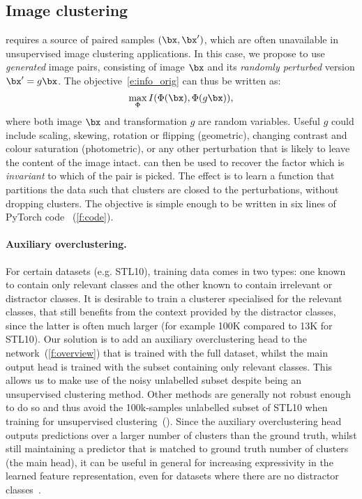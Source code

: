 \subsection{Image clustering}\label{s:image_clustering}

\methodnameshort requires a source of paired samples $(\bx,\bx')$, which are often unavailable in unsupervised image clustering applications. In this case, we propose to use \emph{generated} image pairs, consisting of image $\bx$ and its \emph{randomly perturbed} version $\bx' = g\bx$. The objective~\cref{e:info_orig} can thus be written as:
%
\begin{equation}\label{e:info_clustering}
\max_\Phi I(\Phi(\bx),\Phi(g\bx)),
\end{equation}
%
where both image $\bx$ and transformation $g$ are random variables.
Useful $g$ could include scaling, skewing, rotation or flipping (geometric), changing contrast and colour saturation (photometric), or any other perturbation that is likely to leave the content of the image intact.
\methodnameshort can then be used to recover the factor which is \emph{invariant} to which of the pair is picked. 
The effect is to learn a function that partitions the data such that clusters are closed to the perturbations, without dropping clusters. 
The objective is simple enough to be written in six lines of PyTorch code ~(\cref{f:code}).

 

%

\paragraph{Auxiliary overclustering.}\label{s:overcluster}

For certain datasets (e.g. STL10), training data comes in two types: one known to contain only relevant classes and the other known to contain irrelevant or distractor classes. It is desirable to train a clusterer specialised for the relevant classes, that still benefits from the context provided by the distractor classes, since the latter is often much larger (for example 100K compared to 13K for STL10).
Our solution is to add an auxiliary overclustering head to the network~(\cref{f:overview}) that is trained with the full dataset, whilst the main output head is trained with the subset containing only relevant classes.
This allows us to make use of the noisy unlabelled subset despite being an unsupervised clustering method. 
Other methods are generally not robust enough to do so and thus avoid the 100k-samples unlabelled subset of STL10 when training for unsupervised clustering~(\cite{chang2017deep, haeusser2018associative,xie2016unsupervised}).
Since the auxiliary overclustering head outputs predictions over a larger number of clusters than the ground truth, whilst still maintaining a predictor that is matched to ground truth number of clusters (the main head), it can be useful in general for increasing expressivity in the learned feature representation, even for datasets where there are no distractor classes~\cite{caron2018deep}.

